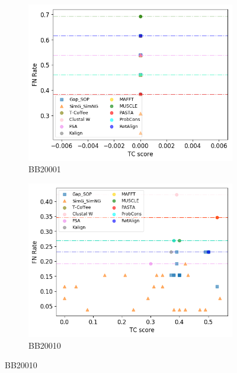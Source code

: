 \begin{figure}[!htbp]
	\centering
	\begin{adjustwidth}{-1cm}{-1cm}
		\begin{subfigure}{0.22\textwidth}
			\includegraphics[width=\columnwidth]{Figure/summary/precomputedInit/Balibase/BB20001_fnrate_vs_tc_2}
			\caption{BB20001}
		\end{subfigure}	
		\begin{subfigure}{0.22\textwidth}
			\includegraphics[width=\columnwidth]{Figure/summary/precomputedInit/Balibase/BB20010_fnrate_vs_tc_2}
			\caption{BB20010}
		\end{subfigure}

\end{adjustwidth}
\end{figure}
